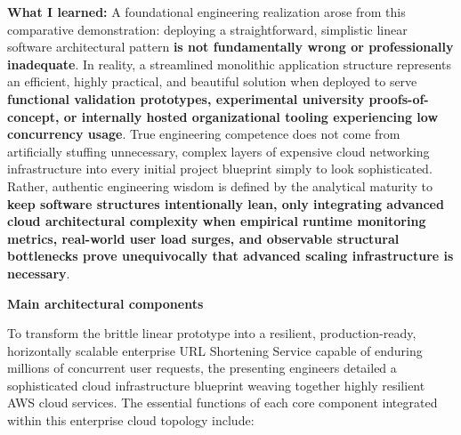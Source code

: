 \textbf{What I learned:} A foundational engineering realization arose
from this comparative demonstration: deploying a straightforward,
simplistic linear software architectural pattern \textbf{is not
fundamentally wrong or professionally inadequate}. In reality, a
streamlined monolithic application structure represents an efficient,
highly practical, and beautiful solution when deployed to serve
\textbf{functional validation prototypes, experimental university
proofs-of-concept, or internally hosted organizational tooling
experiencing low concurrency usage}. True engineering competence does
not come from artificially stuffing unnecessary, complex layers of
expensive cloud networking infrastructure into every initial project
blueprint simply to look sophisticated. Rather, authentic engineering
wisdom is defined by the analytical maturity to \textbf{keep software
structures intentionally lean, only integrating advanced cloud
architectural complexity when empirical runtime monitoring metrics,
real-world user load surges, and observable structural bottlenecks prove
unequivocally that advanced scaling infrastructure is necessary}.

\vspace{0.5em}\noindent\textbf{Main architectural
components}\par

To transform the brittle linear prototype into a resilient,
production-ready, horizontally scalable enterprise URL Shortening
Service capable of enduring millions of concurrent user requests, the
presenting engineers detailed a sophisticated cloud infrastructure
blueprint weaving together highly resilient AWS cloud services. The
essential functions of each core component integrated within this
enterprise cloud topology include:


